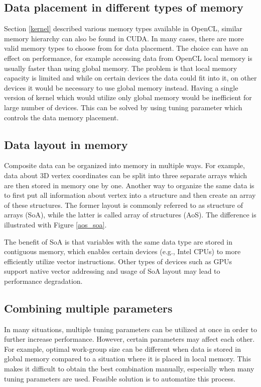 \documentclass
[
    digital, %
    oneside, %
    table, %
    nolof, %
    nolot, %
    nocover %
]{fithesis3}
\begin{document}
\subsection{Data placement in different types of memory}
Section \ref{kernel} described various memory types available in OpenCL, similar memory hierarchy can also be found in CUDA. In many cases, there are
more valid memory types to choose from for data placement. The choice can have an effect on performance, for example accessing data from OpenCL local
memory is usually faster than using global memory. The problem is that local memory capacity is limited and while on certain devices the data could
fit into it, on other devices it would be necessary to use global memory instead. Having a single version of kernel which would utilize only global
memory would be inefficient for large number of devices. This can be solved by using tuning parameter which controls the data memory placement.

\subsection{Data layout in memory}
Composite data can be organized into memory in multiple ways. For example, data about 3D vertex coordinates can be split into three separate arrays
which are then stored in memory one by one. Another way to organize the same data is to first put all information about vertex into a structure and
then create an array of these structures. The former layout is commonly referred to as structure of arrays (SoA), while the latter is called array
of structures (AoS). The difference is illustrated with Figure \ref{aos_soa}.

The benefit of SoA is that variables with the same data type are stored in contiguous memory, which enables certain devices (e.g., Intel CPUs) to more
efficiently utilize vector instructions. Other types of devices such as GPUs support native vector addressing and usage of SoA layout may lead to
performance degradation.

\subsection{Combining multiple parameters}
In many situations, multiple tuning parameters can be utilized at once in order to further increase performance. However, certain parameters may affect
each other. For example, optimal work-group size can be different when data is stored in global memory compared to a situation where it is placed in
local memory. This makes it difficult to obtain the best combination manually, especially when many tuning parameters are used. Feasible solution is to
automatize this process.
\end{document}
